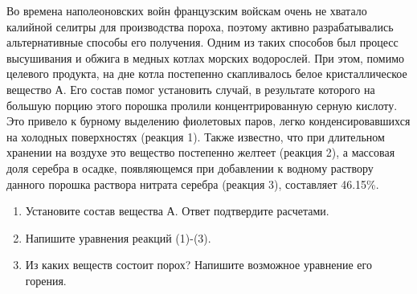 
Во времена наполеоновских войн французским войскам очень не хватало калийной селитры для производства пороха, 
поэтому активно разрабатывались альтернативные способы его получения. Одним из таких способов был процесс 
высушивания и обжига в медных котлах морских водорослей. При этом, помимо целевого продукта, на дне котла 
постепенно скапливалось белое кристаллическое вещество А. Его состав помог установить случай, в результате 
которого на большую порцию этого порошка пролили концентрированную серную кислоту. Это привело к бурному 
выделению фиолетовых паров, легко конденсировавшихся на холодных поверхностях (реакция 1). Также известно, 
что при длительном хранении на воздухе это вещество постепенно желтеет (реакция 2), а массовая доля серебра 
в осадке, появляющемся при добавлении к водному раствору данного порошка раствора нитрата серебра (реакция 3), 
составляет 46.15\%.

\begin{enumerate}
    \item Установите состав вещества А. Ответ подтвердите расчетами.
    \item Напишите уравнения реакций (1)-(3).
    \item Из каких веществ состоит порох? Напишите возможное уравнение его горения.
\end{enumerate}